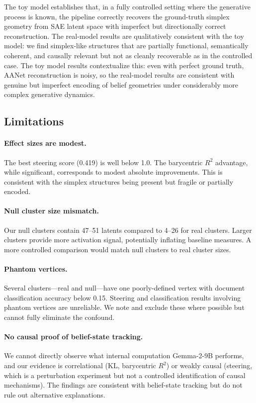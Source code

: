 \documentclass{article}
\begin{document}
The toy model establishes that, in a fully controlled setting where the generative
process is known, the pipeline correctly recovers the ground-truth simplex geometry
from SAE latent space with imperfect but directionally correct reconstruction.  The
real-model results are qualitatively consistent with the toy model: we find
simplex-like structures that are partially functional, semantically coherent, and
causally relevant but not as cleanly recoverable as in the controlled case.  The
toy model results contextualize this: even with perfect ground truth, AANet
reconstruction is noisy, so the real-model results are consistent with genuine but
imperfect encoding of belief geometries under considerably more complex generative
dynamics.

\subsection{Limitations}
\label{sec:limitations}

\paragraph{Effect sizes are modest.}
The best steering score (0.419) is well below 1.0.  The barycentric $R^2$ advantage,
while significant, corresponds to modest absolute improvements.  This is consistent
with the simplex structures being present but fragile or partially encoded.

\paragraph{Null cluster size mismatch.}
Our null clusters contain 47--51 latents compared to 4--26 for real clusters.
Larger clusters provide more activation signal, potentially inflating baseline
measures.  A more controlled comparison would match null clusters to real cluster sizes.

\paragraph{Phantom vertices.}
Several clusters---real and null---have one poorly-defined vertex with document
classification accuracy below 0.15.  Steering and classification results involving
phantom vertices are unreliable.  We note and exclude these where possible but cannot
fully eliminate the confound.

\paragraph{No causal proof of belief-state tracking.}
We cannot directly observe what internal computation Gemma-2-9B performs, and our
evidence is correlational (KL, barycentric $R^2$) or weakly causal (steering, which
is a perturbation experiment but not a controlled identification of causal
mechanisms).  The findings are consistent with belief-state tracking but do not rule
out alternative explanations.
\end{document}
